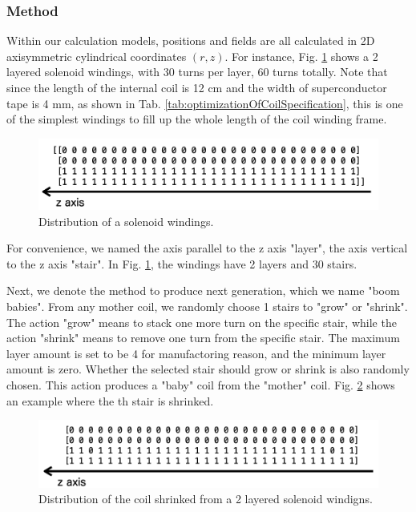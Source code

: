 \subsubsection{Method}
Within our calculation models, positions and fields are all calculated in 2D axisymmetric cylindrical coordinates $(r, z)$.
For instance, Fig. \ref{fig:coilDistributionSolenoid} shows a 2 layered solenoid windings,
with 30 turns per layer, 60 turns totally.
Note that since the length of the internal coil is 12 cm and the width of superconductor tape is 4 mm,
as shown in Tab. \ref{tab:optimizationOfCoilSpecification},
this is one of the simplest windings to fill up the whole length of the coil winding frame.
\begin{figure}[H]
  \includegraphics[width=18cm, bb=9 9 900 200]{./section4Optimal/solenoidCoilDistribution.png}
  \caption{Distribution of a solenoid windings.}
  \label{fig:coilDistributionSolenoid}
\end{figure}
For convenience, we named the axis parallel to the z axis "layer", the axis vertical to the z axis "stair".
In Fig. \ref{fig:coilDistributionSolenoid}, the windings have 2 layers and 30 stairs.

Next, we denote the method to produce next generation,
which we name "boom babies".
From any mother coil, we randomly choose 1 stairs to "grow" or "shrink".
The action "grow" means to stack one more turn on the specific stair,
while the action "shrink" means to remove one turn from the specific stair.
The maximum layer amount is set to be 4 for manufactoring reason,
and the minimum layer amount is zero.
Whether the selected stair should grow or shrink is also randomly chosen.
This action produces a "baby" coil from the "mother" coil.
Fig. \ref{fig:exampleDistribution} shows an example where the th stair is shrinked.
\begin{figure}[H]
  \includegraphics[width=18cm, bb=9 9 900 200]{./section4Optimal/exampleShrinkedCoil.png}
  \caption{Distribution of the coil shrinked from a 2 layered solenoid windigns.}
  \label{fig:exampleDistribution}
\end{figure}

